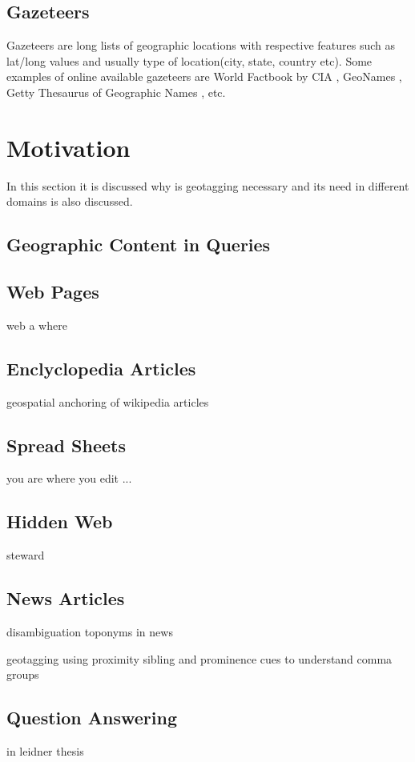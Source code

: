 \documentclass[
     11pt,         %
     a4paper,      %
     oneside,
     ]{article}
\begin{document}
\subsection{Gazeteers} 
Gazeteers are long lists of geographic locations with respective features such as lat/long values and usually type of location(city, state, country etc). Some examples of online available gazeteers are World Factbook by CIA \cite{gazeteer-cia}, GeoNames \cite{gazeteer-geonames}, Getty Thesaurus of Geographic Names \cite{gazeteer-getty}, etc.

\section{Motivation}\label{sec:sections}
In this section it is discussed why is geotagging necessary and its need in different domains is also discussed.
\subsection{Geographic Content in Queries}
\cite{Gan:2008:AGQ:1367798.1367806}
\subsection{Web Pages} web a where
\subsection{Enclyclopedia Articles} geospatial anchoring of wikipedia articles \cite{Kienreich:2006:GAE:1153927.1154675}
\subsection{Spread Sheets} you are where you edit ...
\subsection{Hidden Web} steward
\subsection{News Articles} 

disambiguation toponyms in news \cite{Garbin:2005:DTN:1220575.1220621}

geotagging using proximity sibling and prominence cues to understand comma groups \cite{Lieberman:2010:GUP:1722080.1722088}

\subsection{Question Answering} in leidner thesis
\end{document}
